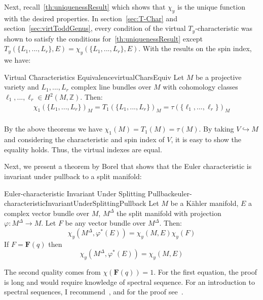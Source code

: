 \documentclass{ut-thesis}
\newenvironment{Proof}[1][]
  {\begin{ProofTcb}[#1]}
  {\end{ProofTcb}}
\newcommand{\Z}{{\mathbb{Z}}}
\renewcommand{\phi}{\varphi}
\begin{document}
Next, recall~\cref{th:uniquenessResult} which shows that $\chi_y$ is the unique function with the desired
properties. In section~\ref{sec:T-Char} and section~\ref{sec:virtToddGenus}, every condition of the virtual
$T_y$-characteristic was shown to satisfy the conditions for~\cref{th:uniquenessResult} except $T_y(\{L_1,...,
L_r\},E) = \chi_y(\{L_1,..., L_r\},E)$. With the results on the spin index, we have:

\begin{thm}{Virtual Characteristics Equivalence}{virtualCharsEquiv}
  Let $M$ be a projective variety and $L_1,..., L_r$ complex line bundles over $M$ with cohomology classes
  $\ell_1, ..., \ell_r \in H^2(M, \Z)$. Then:
  \begin{align*}
    \chi_1(\{L_1, ..., L_r\})_M = T_1(\{L_1, ..., L_r\})_M = \tau(\{\ell_1, ..., \ell_r\})_M\\
  \end{align*}
\end{thm}

\begin{Proof}
  By the above theorems we have $\chi_1(M) = T_1(M) = \tau(M)$. By taking $V \hookrightarrow M$ and
  considering the characteristic and spin index of $V$, it is easy to
  show the equality holds. Thus, the virtual indexes are equal.
\end{Proof}

Next, we present a theorem by Borel that shows that the Euler characteristic is invariant under pullback to
a split manifold:

\begin{thm}{Euler-characteristic Invariant Under Splitting Pullback}{euler-characteristicInvariantUnderSplittingPullback}
  Let $M$ be a K\"ahler manifold, $E$ a complex vector bundle over $M$, $M^\Delta$ the split manifold with projection
  $\phi: M^\Delta \to M$. Let $F$ be any vector bundle over $M^\Delta$. Then:
  \[
    \chi_y(M^\Delta, \phi^*(E)) = \chi_y(M, E)\chi_y(F)
  \]
  If $F = \mathbf{F}(q)$ then
  \[
    \chi_y(M^\Delta, \phi^*(E)) = \chi_y(M, E)
  \]
\end{thm}

\begin{Proof}
  The second quality comes from $\chi(\mathbf{F}(q)) =1$. For the first equation, the proof is long and would
  require knowledge of spectral sequence. For an introduction to spectral sequences, I
  recommend~\cite{hatcherSpectralSequences}, and for the proof
  see~\cite[Appendix~2]{hirzebruchTopologicalMethodsAlgebraic1995}.
\end{Proof}
\end{document}
